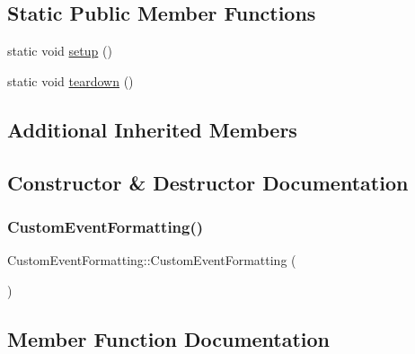 \subsection*{Static Public Member Functions}
\begin{DoxyCompactItemize}
\item 
static void \mbox{\hyperlink{structCustomEventFormatting_afa31bc14664c09cbbfb6cdb594877d10}{setup}} ()
\item 
static void \mbox{\hyperlink{structCustomEventFormatting_a25ccfb0a43a0f7230dae74e051d9877d}{teardown}} ()
\end{DoxyCompactItemize}
\subsection*{Additional Inherited Members}


\subsection{Constructor \& Destructor Documentation}
\mbox{\label{structCustomEventFormatting_a390808ddc7445b07d09e5bc751439006}} 
\subsubsection{\texorpdfstring{CustomEventFormatting()}{CustomEventFormatting()}}
{\footnotesize\ttfamily Custom\+Event\+Formatting\+::\+Custom\+Event\+Formatting (\begin{DoxyParamCaption}{ }\end{DoxyParamCaption})\hspace{0.3cm}{\ttfamily [inline]}}



\subsection{Member Function Documentation}
\mbox{\label{structCustomEventFormatting_a70972af16c2e76b7a108ee6389a3fef8}} 
